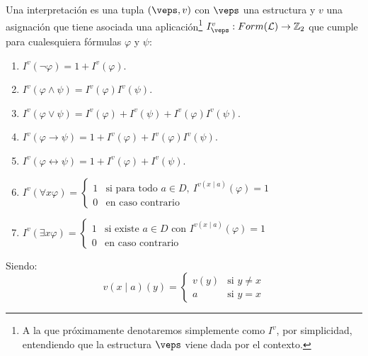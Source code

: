 \begin{definicion}[Interpretación]
    Una interpretación es una tupla $(\veps,v)$ con $\veps$ una estructura y $v$ una asignación que tiene asociada una aplicación\footnote{A la que próximamente denotaremos simplemente como $I^v$, por simplicidad, entendiendo que la estructura $\veps$ viene dada por el contexto.} $I_\veps^v:Form(\mathcal{L})\to\mathbb{Z}_2$ que cumple para cualesquiera fórmulas $\varphi$ y $\psi$:
    \begin{enumerate}
        \item $I^v(\lnot \varphi) = 1+ I^v(\varphi)$.
        \item $I^v(\varphi\land \psi) = I^v(\varphi)I^v(\psi)$.
        \item $I^v(\varphi\lor \psi) = I^v(\varphi) + I^v(\psi) + I^v(\varphi)I^v(\psi)$.
        \item $I^v(\varphi\to \psi) = 1 + I^v(\varphi) + I^v(\varphi)I^v(\psi)$.
        \item $I^v(\varphi\leftrightarrow \psi) = 1 + I^v(\varphi) + I^v(\psi)$.
        \item $I^v(\forall x\varphi) = \left\{\begin{array}{ll}
                    1 & \text{si para todo\ } a\in D,\ I^{v(x\mid a)}(\varphi) = 1 \\
                    0 & \text{en caso contrario}
        \end{array}\right.$
        \item $I^v(\exists x\varphi) = \left\{\begin{array}{ll}
                    1 & \text{si existe\ } a\in D \text{\ con\ } I^{v(x\mid a)}(\varphi) = 1 \\
                    0 & \text{en caso contrario}
        \end{array}\right.$
    \end{enumerate}
    Siendo:
    \begin{equation*}
        v(x\mid a)(y) = \left\{\begin{array}{ll}
                v(y) & \text{si\ } y\neq x \\
                a & \text{si\ } y=x
        \end{array}\right.
    \end{equation*}
\end{definicion}


